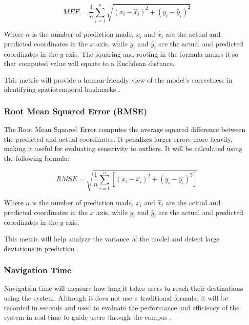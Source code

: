 \begin{refsection}
\begin{equation}
MEE = \frac{1}{n} \sum_{i=1}^{n} \sqrt{(x_i - \hat{x}_i)^2 + (y_i - \hat{y}_i)^2}
\label{eq:mee}
\end{equation}

Where \(n\) is the number of prediction made, \(x_i\) and \(\hat{x}_i\) are the actual and predicted coordinates in the \(x\) axis, while \(y_i\) and \(\hat{y}_i\) are the actual and predicted coordinates in the \(y\) axis. The squaring and rooting in the formula makes it so that computed value will equate to a Euclidean distance.

This metric will provide a human-friendly view of the model's correctness in identifying spatiotemporal landmarks \cite{gmd-15-5481-2022}.

\subsubsection{Root Mean Squared Error (RMSE)}

The Root Mean Squared Error computes the average squared difference between the predicted and actual coordinates. It penalizes larger errors more heavily, making it useful for evaluating sensitivity to outliers. It will be calculated using the following formula:

\begin{equation}
RMSE = \sqrt{\frac{1}{n} \sum_{i=1}^{n} [(x_i - \hat{x_i})^2 + (y_i - \hat{y_i})^2]}
\label{eq:rmse}
\end{equation}

Where \(n\) is the number of prediction made, \(x_i\) and \(\hat{x}_i\) are the actual and predicted coordinates in the \(x\) axis, while \(y_i\) and \(\hat{y}_i\) are the actual and predicted coordinates in the \(y\) axis.

This metric will help analyze the variance of the model and detect large deviations in prediction \cite{gmd-15-5481-2022}.

\subsubsection{Navigation Time}

Navigation time will measure how long it takes users to reach their destinations using the system. Although it does not use a traditional formula, it will be recorded in seconds and used to evaluate the performance and efficiency of the system in real time to guide users through the campus \cite{one}.


\end{refsection}
